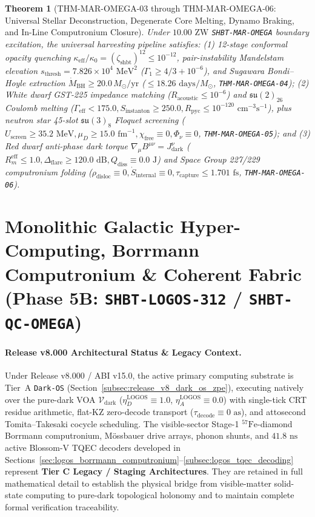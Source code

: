 \documentclass[11pt,onecolumn]{article}
\newtheorem{theorem}{Theorem}
\begin{document}
\begin{theorem}[THM-MAR-OMEGA-03 through THM-MAR-OMEGA-06: Universal Stellar Deconstruction, Degenerate Core Melting, Dynamo Braking, and In-Line Computronium Closure]
\label{thm:mar_omega_03_06}
Under $10.00\text{ ZW}$ \texttt{SHBT-MAR-OMEGA} boundary excitation, the universal harvesting pipeline satisfies: (1) 12-stage conformal opacity quenching $\kappa_{\text{eff}}/\kappa_0 = (\zeta_{\text{shbt}})^{12} \le 10^{-12}$, pair-instability Mandelstam elevation $s_{\text{thresh}} = 7.826 \times 10^4\text{ MeV}^2$ ($\Gamma_1 \ge 4/3 + 10^{-6}$), and Sugawara Bondi--Hoyle extraction $\dot{M}_{\text{BH}} \ge 20.0\,M_\odot/\text{yr}$ ($\le 18.26\text{ days}/M_\odot$, \texttt{THM-MAR-OMEGA-04}); (2) White dwarf GST-225 impedance matching ($R_{\text{acoustic}} \le 10^{-6}$) and $\mathfrak{su}(2)_{26}$ Coulomb melting ($\Gamma_{\text{eff}} < 175.0, S_{\text{instanton}} \ge 250.0, R_{\text{pyc}} \le 10^{-120}\text{ cm}^{-3}\text{s}^{-1}$), plus neutron star 45-slot $\mathfrak{su}(3)_8$ Floquet screening ($U_{\text{screen}} \ge 35.2\text{ MeV}, \mu_D \ge 15.0\text{ fm}^{-1}, \chi_{\text{free}} \equiv 0, \Phi_\nu \equiv 0$, \texttt{THM-MAR-OMEGA-05}); and (3) Red dwarf anti-phase dark torque $\nabla_\mu B^{\mu\nu} = J_{\text{dark}}^\nu$ ($R_m^{\text{eff}} \le 1.0, \Delta_{\text{flare}} \ge 120.0\text{ dB}, Q_{\text{diss}} \equiv 0.0\text{ J}$) and Space Group 227/229 computronium folding ($\rho_{\text{disloc}} \equiv 0, \dot{S}_{\text{internal}} \equiv 0, \tau_{\text{capture}} \le 1.701\text{ fs}$, \texttt{THM-MAR-OMEGA-06}).
\end{theorem}
\FloatBarrier

\section{Monolithic Galactic Hyper-Computing, Borrmann Computronium \& Coherent Fabric (Phase 5B: \texttt{SHBT-LOGOS-312} / \texttt{SHBT-QC-OMEGA})}
\paragraph{Release v8.000 Architectural Status \& Legacy Context.}
Under Release v8.000 / ABI v15.0, the active primary computing substrate is Tier~A \texttt{Dark-OS} (Section~\ref{subsec:release_v8_dark_os_zpe}), executing natively over the pure-dark VOA $\mathcal{V}_{\text{dark}}$ ($\eta_D^{\text{LOGOS}}\equiv1.0$, $\eta_A^{\text{LOGOS}}\equiv0.0$) with single-tick CRT residue arithmetic, flat-KZ zero-decode transport ($\tau_{\text{decode}}\equiv0\text{ as}$), and attosecond Tomita--Takesaki cocycle scheduling. The visible-sector Stage-1 $^{57}\text{Fe}$-diamond Borrmann computronium, M\"ossbauer drive arrays, phonon shunts, and $41.8\text{ ns}$ active Blossom-V TQEC decoders developed in Sections~\ref{sec:logos_borrmann_computronium}--\ref{subsec:logos_tqec_decoding} represent \textbf{Tier C Legacy / Staging Architectures}. They are retained in full mathematical detail to establish the physical bridge from visible-matter solid-state computing to pure-dark topological holonomy and to maintain complete formal verification traceability.
\end{document}
